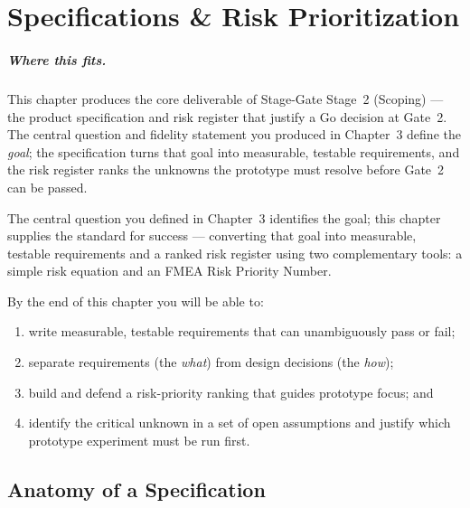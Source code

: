 
\chapter{Specifications \& Risk Prioritization}
\label{ch:specifications}

\paragraph{Where this fits.}
This chapter produces the core deliverable of Stage-Gate Stage~2
(Scoping) --- the product specification and risk register that justify a
Go decision at Gate~2.
The central question and fidelity statement you produced in Chapter~3
define the \emph{goal}; the specification turns that goal into
measurable, testable requirements, and the risk register ranks the
unknowns the prototype must resolve before Gate~2 can be passed.

The central question you defined in Chapter~3 identifies the goal; this chapter supplies the standard for success --- converting that goal into measurable, testable requirements and a ranked risk register using two complementary tools: a simple risk equation and an FMEA Risk Priority Number.

By the end of this chapter you will be able to:
\begin{enumerate}
  \item write measurable, testable requirements that can unambiguously pass or fail;
  \item separate requirements (the \emph{what}) from design decisions (the \emph{how});
  \item build and defend a risk-priority ranking that guides prototype focus; and
  \item identify the critical unknown in a set of open assumptions and justify which prototype experiment must be run first.

\end{enumerate}

\section{Anatomy of a Specification}
\label{sec:ch4-anatomy}


